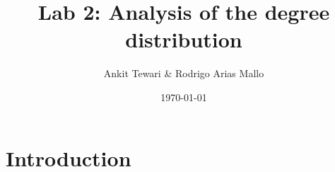 \documentclass[a4paper]{article}
\title{Lab 2: Analysis of the degree distribution}
\author{Ankit Tewari \& Rodrigo Arias Mallo}
\date{\today}
\begin{document}
\maketitle

\section{Introduction}


\end{document}
